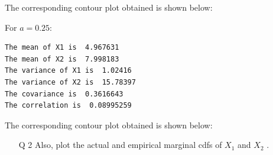\documentclass[12pt]{book}
\begin{document}
The corresponding contour plot obtained is shown below:
\begin{figure}[H]
	\centering
\end{figure}
\newpage
For $a=0.25$:
\begin{lstlisting}
The mean of X1 is  4.967631 
The mean of X2 is  7.998183 
The variance of X1 is  1.02416 
The variance of X2 is  15.78397 
The covariance is  0.3616643 
The correlation is  0.08995259
\end{lstlisting}
The corresponding contour plot obtained is shown below:
\begin{figure}[H]
	\centering
\end{figure}

 

\newpage
\begin{enumerate}
\item[Q 2] Also, plot the actual and empirical marginal cdfs of $X_1$ and $X_2$ .
\end{enumerate}
\end{document}
